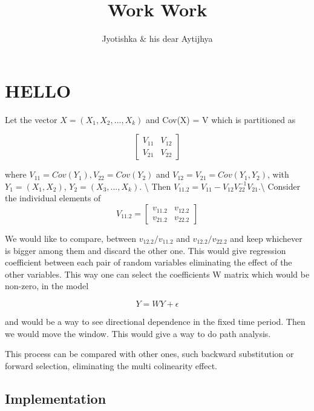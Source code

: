 \documentclass[
  12pt,
]{article}
\title{Work Work}
\author{Jyotishka \& his dear Aytijhya}
\date{}
\begin{document}
\maketitle


\hypertarget{hello}{%
\section{HELLO}\label{hello}}

Let the vector \(X = (X_1, X_2, . . . , X_k)\) and Cov(X) = V which is
partitioned as

\[\begin{bmatrix}
V_{11} & V_{12}\\
V_{21} & V_{22}
\end{bmatrix}\]

where \(V_{11} = Cov(Y_1), V_{22} = Cov(Y_2)\) and
\(V_{12} = V_{21} = Cov(Y_1, Y_2)\), with \(Y_1 = (X_1, X_2)\),
\(Y_2 = (X_3, . . . , X_k)\). \textbackslash{} Then
\(V_{11.2} = V_{11} - V_{12}V_{22}^{-1}V_{21}\).\textbackslash{}
Consider the individual elements of \[V_{11.2} =
\begin{bmatrix}
v_{11.2} & v_{12.2} \\
v_{21.2} & v_{22.2}
\end{bmatrix}\]

We would like to compare, between \(v_{12.2}/v_{11.2}\) and
\(v_{12.2}/v_{22.2}\) and keep whichever is bigger among them and
discard the other one. This would give regression coefficient between
each pair of random variables eliminating the effect of the other
variables. This way one can select the coefficients W matrix which would
be non-zero, in the model

\[Y = W Y + \epsilon\]

and would be a way to see directional dependence in the fixed time
period. Then we would move the window. This would give a way to do path
analysis.

This process can be compared with other ones, such backward substitution
or forward selection, eliminating the multi colinearity effect.

\hypertarget{implementation}{%
\subsection{Implementation}\label{implementation}}
\end{document}
